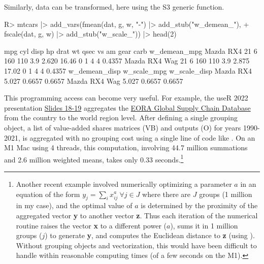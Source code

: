 \documentclass[nojss]{jss} %
\newcommand{\fct}[1]{\code{#1()}}
\begin{document}
%
Similarly, data can be transformed, here using the S3 generic \fct{fscale} function.
%
\begin{Schunk}
\begin{Sinput}
R> mtcars |> add_vars(fmean(dat, g, w, "-") |> add_stub("w_demean_"),
+    fscale(dat, g, w) |> add_stub("w_scale_")) |> head(2)
\end{Sinput}
\begin{Soutput}
              mpg cyl disp  hp drat    wt  qsec vs am gear carb w_demean_mpg
Mazda RX4      21   6  160 110  3.9 2.620 16.46  0  1    4    4       0.4357
Mazda RX4 Wag  21   6  160 110  3.9 2.875 17.02  0  1    4    4       0.4357
              w_demean_disp w_scale_mpg w_scale_disp
Mazda RX4             5.027      0.6657       0.6657
Mazda RX4 Wag         5.027      0.6657       0.6657
\end{Soutput}
\end{Schunk}
%
This programming access can become very useful. For example, the useR 2022 presentation \href{https://raw.githubusercontent.com/SebKrantz/collapse/master/misc/useR2022\%20presentation/collapse_useR2022_final.pdf}{Slides 18-19} aggregates the \href{https://worldmrio.com/}{EORA Global Supply Chain Database} from the country to the world region level. After defining a single grouping object, a list of value-added shares matrices (VB) and outputs (O) for years 1990-2021, is aggregated with no grouping cost using a single line of code like . On an M1 Mac using 4 threads, this computation, involving 44.7 million summations and 2.6 million weighted means, takes only 0.33 seconds.\footnote{Another recent example involved numerically optimizing a parameter $a$ in an equation of the form $y_j = \sum_i x_{ij}^a\ \forall j\in J$ where there are $J$ groups (1 million in my case), and the optimal value of $a$ is determined by the proximity of the aggregated vector \textbf{y} to another vector \textbf{z}. Thus each iteration of the numerical routine raises the vector \textbf{x} to a different power ($a$), sums it in 1 million groups ($j$) to generate \textbf{y}, and computes the Euclidean distance to \textbf{z} (using ). Without grouping objects and vectorization, this would have been difficult to handle within reasonable computing times (of a few seconds on the M1).}
%
\end{document}
